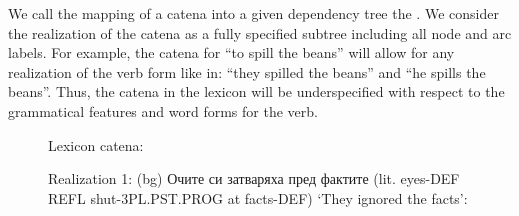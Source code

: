 \documentclass[output=paper,colorlinks,citecolor=brown]{langscibook}
\begin{document}
We call the mapping of a catena into a given dependency tree the . We consider the realization of the catena as a fully specified subtree including all node and arc labels. For example, the catena for ``to spill the beans'' will allow for any realization of the verb form like in: ``they spilled the beans'' and ``he spills the beans''. Thus, the catena in the lexicon will be underspecified with respect to the grammatical features and word forms for the verb.



\begin{figure}[p]
Lexicon catena:

  \begin{center}  
  \end{center}  

Realization 1: 
(bg) {Очите си затваряха пред фактите }
(lit. eyes-DEF REFL shut-3PL.PST.PROG at facts-DEF) {`They ignored the facts'}:



\end{figure}
\end{document}
